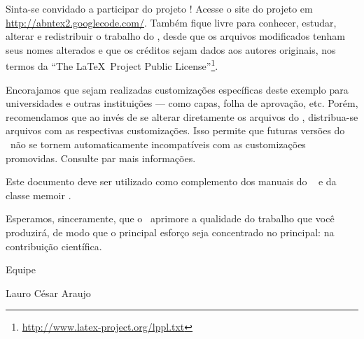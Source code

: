 Sinta-se convidado a participar do projeto \abnTeX! Acesse o site do projeto em
\url{http://abntex2.googlecode.com/}. Também fique livre para conhecer,
estudar, alterar e redistribuir o trabalho do \abnTeX, desde que os arquivos
modificados tenham seus nomes alterados e que os créditos sejam dados aos
autores originais, nos termos da ``The \LaTeX\ Project Public
License''\footnote{\url{http://www.latex-project.org/lppl.txt}}.

Encorajamos que sejam realizadas customizações específicas deste exemplo para
universidades e outras instituições --- como capas, folha de aprovação, etc.
Porém, recomendamos que ao invés de se alterar diretamente os arquivos do
\abnTeX, distribua-se arquivos com as respectivas customizações.
Isso permite que futuras versões do \abnTeX~não se tornem automaticamente
incompatíveis com as customizações promovidas. Consulte
 par mais informações.

Este documento deve ser utilizado como complemento dos manuais do \abnTeX\ 
\cite{abntex2classe,abntex2cite,abntex2cite-alf} e da classe \textsf{memoir}
\cite{memoir}. 

Esperamos, sinceramente, que o \abnTeX\ aprimore a qualidade do trabalho que
você produzirá, de modo que o principal esforço seja concentrado no principal:
na contribuição científica.

Equipe \abnTeX 

Lauro César Araujo


